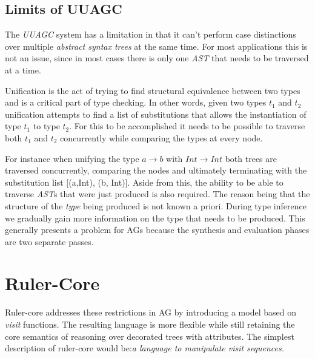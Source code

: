 \subsection{Limits of UUAGC}
The \emph{UUAGC} system has a limitation in that it can't perform case distinctions over multiple \emph{abstract syntax trees} at the same time\cite{visitag}. For most applications this is not an issue, since in most cases there is only one \emph{AST} that needs to be traversed at a time. 

Unification is the act of trying to find structural equivalence between two types and is a critical part of type checking. In other words, given two types \emph{$t_{1}$} and \emph{$t_{2}$} unification attempts to find a list of substitutions that allows the instantiation of type \emph{$t_{1}$} to type \emph{$t_{2}$}. For this to be accomplished it needs to be possible to traverse both \emph{$t_{1}$} and \emph{$t_{2}$} concurrently while comparing the types at every node.

%
%    
%

For instance when unifying the type \emph{$a \rightarrow b$} with \emph{$Int \rightarrow Int$} both trees are traversed concurrently, comparing the nodes and ultimately terminating with the substitution list [(a,Int), (b, Int)]. Aside from this, the ability to be able to traverse \emph{AST}s that were just produced is also required. The reason being that the structure of the \emph{type} being produced is not known a priori. During type inference we gradually gain more information on the type that needs to be produced. This generally presents a problem for AGs\cite{ruler-front} because the synthesis and evaluation phases are two separate passes.

\section{Ruler-Core}
Ruler-core addresses these restrictions in AG by introducing a model based on \emph{visit}\cite{visits} functions. The resulting language is more flexible while still retaining the core semantics of reasoning over decorated trees with attributes. The simplest description of ruler-core would be:\emph{a language to manipulate visit sequences.}

